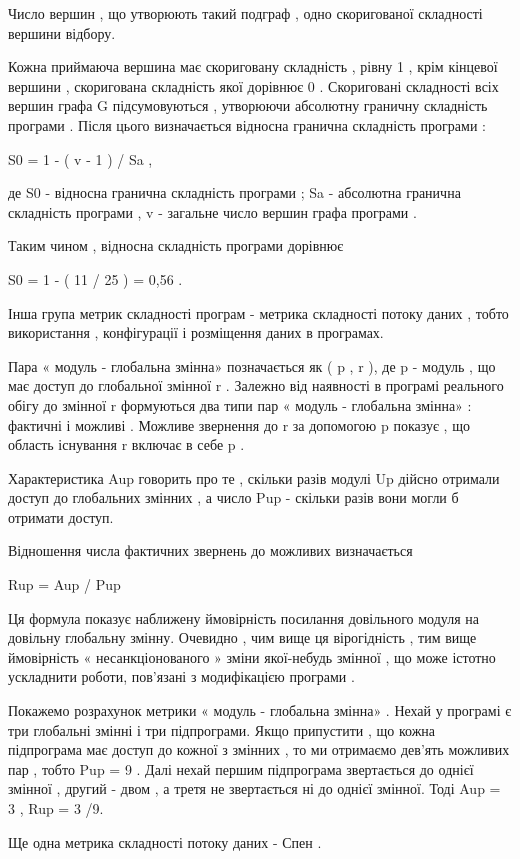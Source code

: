 \documentclass[oneside,final,14pt]{extreport}
\begin{document}
Число вершин , що утворюють такий подграф , одно скоригованої складності вершини відбору.

Кожна приймаюча вершина має скориговану складність , рівну 1 , крім кінцевої вершини , скоригована складність якої дорівнює 0 . Скориговані складності всіх вершин графа G підсумовуються , утворюючи абсолютну граничну складність програми . Після цього визначається відносна гранична складність програми :

S0 = 1 - ( v - 1 ) / Sa ,

де S0 - відносна гранична складність програми ; Sa - абсолютна гранична складність програми , v - загальне число вершин графа програми .

Таким чином , відносна складність програми дорівнює

S0 = 1 - ( 11 / 25 ) = 0,56 .

Інша група метрик складності програм - метрика складності потоку даних , тобто використання , конфігурації і розміщення даних в програмах.

Пара « модуль - глобальна змінна» позначається як ( p , r ), де p - модуль , що має доступ до глобальної змінної r . Залежно від наявності в програмі реального обігу до змінної r формуються два типи пар « модуль - глобальна змінна» : фактичні і можливі . Можливе звернення до r за допомогою p показує , що область існування r включає в себе p .

Характеристика Aup говорить про те , скільки разів модулі Up дійсно отримали доступ до глобальних змінних , а число Pup - скільки разів вони могли б отримати доступ.

Відношення числа фактичних звернень до можливих визначається

Rup = Aup / Pup

Ця формула показує наближену ймовірність посилання довільного модуля на довільну глобальну змінну. Очевидно , чим вище ця вірогідність , тим вище ймовірність « несанкціонованого » зміни якої-небудь змінної , що може істотно ускладнити роботи, пов'язані з модифікацією програми .

Покажемо розрахунок метрики « модуль - глобальна змінна» . Нехай у програмі є три глобальні змінні і три підпрограми. Якщо припустити , що кожна підпрограма має доступ до кожної з змінних , то ми отримаємо дев'ять можливих пар , тобто Pup = 9 . Далі нехай першим підпрограма звертається до однієї змінної , другий - двом , а третя не звертається ні до однієї змінної. Тоді Aup = 3 , Rup = 3 /9.

Ще одна метрика складності потоку даних - Спен .
\end{document}
